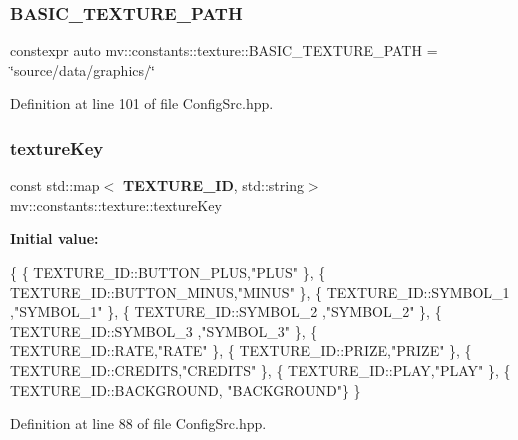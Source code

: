\subsubsection{B\+A\+S\+I\+C\+\_\+\+T\+E\+X\+T\+U\+R\+E\+\_\+\+P\+A\+TH}
{\footnotesize\ttfamily constexpr auto mv\+::constants\+::texture\+::\+B\+A\+S\+I\+C\+\_\+\+T\+E\+X\+T\+U\+R\+E\+\_\+\+P\+A\+TH = \char`\"{}source/data/graphics/\char`\"{}}



Definition at line 101 of file Config\+Src.\+hpp.

\mbox{\label{namespacemv_1_1constants_1_1texture_a81ee4df0a5a51b3c1982cb9e405e7cbb}} 
\subsubsection{texture\+Key}
{\footnotesize\ttfamily const std\+::map$<$\textbf{ T\+E\+X\+T\+U\+R\+E\+\_\+\+ID}, std\+::string$>$ mv\+::constants\+::texture\+::texture\+Key}

{\bfseries Initial value\+:}
\begin{DoxyCode}
\{
        \{ TEXTURE\_ID::BUTTON\_PLUS,\textcolor{stringliteral}{"PLUS"} \},
        \{ TEXTURE\_ID::BUTTON\_MINUS,\textcolor{stringliteral}{"MINUS"} \},
        \{ TEXTURE\_ID::SYMBOL\_1 ,\textcolor{stringliteral}{"SYMBOL\_1"} \},
        \{ TEXTURE\_ID::SYMBOL\_2 ,\textcolor{stringliteral}{"SYMBOL\_2"} \},
        \{ TEXTURE\_ID::SYMBOL\_3 ,\textcolor{stringliteral}{"SYMBOL\_3"} \},
        \{ TEXTURE\_ID::RATE,\textcolor{stringliteral}{"RATE"} \},
        \{ TEXTURE\_ID::PRIZE,\textcolor{stringliteral}{"PRIZE"} \},
        \{ TEXTURE\_ID::CREDITS,\textcolor{stringliteral}{"CREDITS"} \},
        \{ TEXTURE\_ID::PLAY,\textcolor{stringliteral}{"PLAY"} \},
        \{ TEXTURE\_ID::BACKGROUND, \textcolor{stringliteral}{"BACKGROUND"}\}
      \}
\end{DoxyCode}


Definition at line 88 of file Config\+Src.\+hpp.

